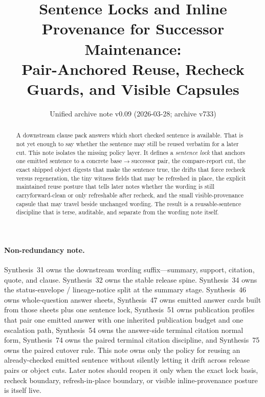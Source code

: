 \documentclass[11pt]{article}
\title{Sentence Locks and Inline Provenance for Successor Maintenance:\\[0.5ex]
\large Pair-Anchored Reuse, Recheck Guards, and Visible Capsules}
\author{}
\date{Unified archive note v0.09 (2026-03-28; archive v733)}
\begin{document}
\maketitle

\begin{abstract}
A downstream clause pack answers which short checked sentence is available.
That is not yet enough to say whether the sentence may still be reused verbatim for a later cut.
This note isolates the missing policy layer.
It defines a \emph{sentence lock} that anchors one emitted sentence to a concrete base$\to$successor pair, the compare-report cut, the exact shipped object digests that make the sentence true, the drifts that force recheck versus regeneration, the tiny witness fields that may be refreshed in place, the explicit maintained reuse posture that tells later notes whether the wording is still carryforward-clean or only refreshable after recheck, and the small visible-provenance capsule that may travel beside unchanged wording.
The result is a reusable-sentence discipline that is terse, auditable, and separate from the wording note itself.
\end{abstract}

\paragraph{Non-redundancy note.}
Synthesis~31 owns the downstream wording suffix---summary, support, citation, quote, and clause.\cite{series:downstreamnormalforms}
Synthesis~32 owns the stable release spine.\cite{series:releasespine}
Synthesis~34 owns the status-envelope / lineage-notice split at the summary stage.\cite{series:statusenvelopes}
Synthesis~46 owns whole-question answer sheets, Synthesis~47 owns emitted answer cards built from those sheets plus one sentence lock, Synthesis~51 owns publication profiles that pair one emitted answer with one inherited publication budget and one escalation path, Synthesis~54 owns the answer-side terminal citation normal form, Synthesis~74 owns the paired terminal citation discipline, and Synthesis~75 owns the paired cutover rule.\cite{series:challengeanswersheets,series:challengeanswercards,series:challengeanswerpublicationprofiles,series:challengeanswerreviewmenus,series:pairedterminalcitationdiscipline,series:pairedterminalcutoverrules}
This note owns only the policy for reusing an already-checked emitted sentence without silently letting it drift across release pairs or object cuts. Later notes should reopen it only when the exact lock basis, recheck boundary, refresh-in-place boundary, or visible inline-provenance posture is itself live.
\end{document}

